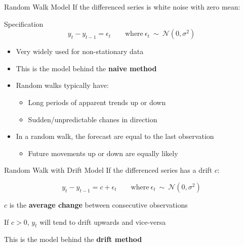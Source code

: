 \documentclass{beamer}
\newenvironment{wideitemize}{\itemize\addtolength{\itemsep}{10pt}}{\enditemize}
\begin{document}
\begin{frame}{Random Walk Model}
  If the differenced series is white noise with zero mean:
  \begin{block}{Specification}
    \begin{equation*}
      y_t - y_{t-1} = \epsilon_t \qquad \text{where} \ \epsilon_t \ \sim \ \mathcal{N}(0, \sigma^2)
    \end{equation*}
  \end{block}

  \begin{itemize}
  \item Very widely used for non-stationary data
  \item This is the model behind the \textbf{naive method}
  \item Random walks typically have:
    \begin{itemize}
    \item Long periods of apparent trends up or down
    \item Sudden/unpredictable chanes in direction
    \end{itemize}
  \item In a random walk, the forecast are equal to the last observation
    \begin{itemize}
    \item Future movements up or down are equally likely
    \end{itemize}
  \end{itemize}   
\end{frame}


\begin{frame}{Random Walk with Drift Model}
  If the differenced series has a drift $c$:

  \begin{equation*}
    y_t - y_{t-1} = c + \epsilon_t \qquad \text{where} \ \epsilon_t \ \sim \ \mathcal{N}(0, \sigma^2)
  \end{equation*}
  
  \begin{wideitemize}
  \item $c$ is the \textbf{average change} between consecutive observations
  \item If $c > 0$, $y_t$ will tend to drift upwards and vice-versa
  \item This is the model behind the \textbf{drift method} 
  \end{wideitemize}  
\end{frame}
\end{document}
